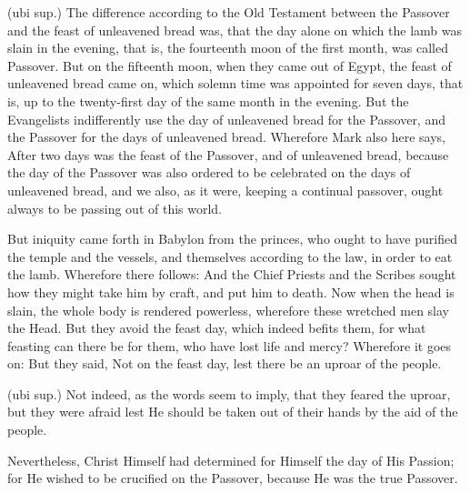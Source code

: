  (ubi sup.) The difference according to the Old Testament between the Passover and the feast of unleavened bread was, that the day alone on which the lamb was slain in the evening, that is, the fourteenth moon of the first month, was called Passover. But on the fifteenth moon, when they came out of Egypt, the feast of unleavened bread came on, which solemn time was appointed for seven days, that is, up to the twenty-first day of the same month in the evening. But the Evangelists indifferently use the day of unleavened bread for the Passover, and the Passover for the days of unleavened bread. Wherefore Mark also here says, After two days was the feast of the Passover, and of unleavened bread, because the day of the Passover was also ordered to be celebrated on the days of unleavened bread, and we also, as it were, keeping a continual passover, ought always to be passing out of this world.

 But iniquity came forth in Babylon from the princes, who ought to have purified the temple and the vessels, and themselves according to the law, in order to eat the lamb. Wherefore there follows: And the Chief Priests and the Scribes sought how they might take him by craft, and put him to death. Now when the head is slain, the whole body is rendered powerless, wherefore these wretched men slay the Head. But they avoid the feast day, which indeed befits them, for what feasting can there be for them, who have lost life and mercy? Wherefore it goes on: But they said, Not on the feast day, lest there be an uproar of the people.

 (ubi sup.) Not indeed, as the words seem to imply, that they feared the uproar, but they were afraid lest He should be taken out of their hands by the aid of the people.

 Nevertheless, Christ Himself had determined for Himself the day of His Passion; for He wished to be crucified on the Passover, because He was the true Passover.

 

